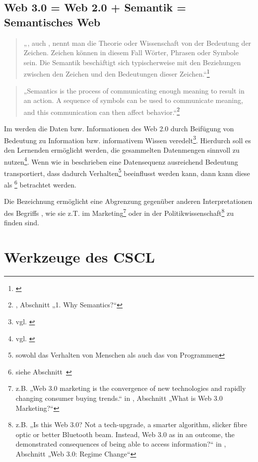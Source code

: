 \subsection{Web 3.0 = Web 2.0 + Semantik = Semantisches Web}

\begin{quote}„, auch , nennt man die Theorie oder Wissenschaft von der Bedeutung der Zeichen. Zeichen können in diesem Fall Wörter, Phrasen oder Symbole sein. Die Semantik beschäftigt sich typischerweise mit den Beziehungen zwischen den Zeichen und den Bedeutungen dieser Zeichen.“\footnote{\cite{wp:semantik}}\end{quote}

\begin{quote}„Semantics is the process of communicating enough meaning to result in an action. A sequence of symbols can be used to communicate meaning, and this communication can then affect behavior.“\footnote{\cite{sagaran}, Abschnitt „1. Why Semantics?“}\end{quote}

Im  werden die Daten bzw. Informationen des Web 2.0 durch Beifügung von Bedeutung zu Information bzw. informativem Wissen veredelt\footnote{vgl. \cite{nyt:markoff}}. Hierdurch soll es den Lernenden ermöglicht werden, die gesammelten Datenmengen sinnvoll zu nutzen\footnote{vgl. \cite{tsp:tolksdorf}}. Wenn wie in \cite{sagaran} beschrieben eine Datensequenz ausreichend Bedeutung transportiert, dass dadurch Verhalten\footnote{sowohl das Verhalten von Menschen als auch das von Programmen} beeinflusst werden kann, dann kann diese als \footnote{siehe Abschnitt~} betrachtet werden.

Die Bezeichnung  ermöglicht eine Abgrenzung gegenüber anderen Interpretationen des Begriffs , wie sie z.T. im Marketing\footnote{z.B. „Web 3.0 marketing is the convergence of new technologies and rapidly changing consumer buying trends.“ in \cite{web3market}, Abschnitt „What is Web 3.0 Marketing?“} oder in der Politikwissenschaft\footnote{z.B. „Is this Web 3.0? Not a tech-upgrade, a smarter algorithm, slicker fibre optic or better Bluetooth beam. Instead, Web 3.0 as in an outcome, the demonstrated consequences of being able to access information?“ in \cite{web3pol}, Abschnitt „Web 3.0: Regime Change“} zu finden sind.


\section{Werkzeuge des CSCL} %
\label{sec:werkzeuge_des_cscl}

